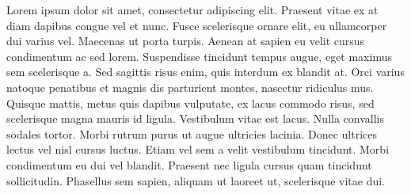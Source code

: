 \begin{spacing}{1}
\begin{titlepage}
    \noindent
    Lorem ipsum dolor sit amet, consectetur adipiscing elit. Praesent vitae ex at diam dapibus congue vel et nunc. Fusce scelerisque ornare elit, eu ullamcorper dui varius vel. Maecenas ut porta turpis. Aenean at sapien eu velit cursus condimentum ac sed lorem. Suspendisse tincidunt tempus augue, eget maximus sem scelerisque a. Sed sagittis risus enim, quis interdum ex blandit at. Orci varius natoque penatibus et magnis dis parturient montes, nascetur ridiculus mus. Quisque mattis, metus quis dapibus vulputate, ex lacus commodo risus, sed scelerisque magna mauris id ligula. Vestibulum vitae est lacus. Nulla convallis sodales tortor. Morbi rutrum purus ut augue ultricies lacinia. Donec ultrices lectus vel nisl cursus luctus. Etiam vel sem a velit vestibulum tincidunt. Morbi condimentum eu dui vel blandit. Praesent nec ligula cursus quam tincidunt sollicitudin. Phasellus sem sapien, aliquam ut laoreet ut, scelerisque vitae dui.
  \end{titlepage}
\end{spacing}